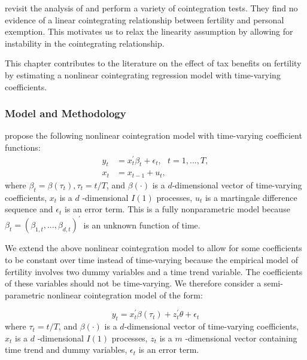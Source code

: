\documentclass[a4paper,12pt,times,numbered,print,index]{report}
\numberwithin{equation}{section}
\begin{document}
 \cite{crump2011fertility} revisit the analysis of \cite{whittington1990fertility} and perform a variety of cointegration tests. They find no evidence of a linear cointegrating relationship between fertility and personal exemption. This motivates us to relax the linearity assumption by allowing for instability in the cointegrating relationship.

This chapter contributes to the literature on the effect of tax benefits on fertility by estimating a nonlinear cointegrating regression model with time-varying coefficients.

\subsubsection*{Model and Methodology}
\cite{phillips2017estimating} propose the following nonlinear cointegration
model with time-varying coefficient functions:%
\begin{align*}
y_{t} &= x_{t}^{\prime }\beta _{t}+\epsilon _{t},\ \ \ t=1,...,T,
\\
x_{t} &= x_{t-1}+u_{t},  \nonumber
\end{align*}%
where $\beta _{t}=\beta \left( \tau _{t}\right) ,\tau _{t}=t/T$, and $\beta \left(
\cdot \right) $ is a $d$-dimensional vector of time-varying coefficients, $x_{t}$ is a $d$%
-dimensional $I\left( 1\right) $ processes, $u_{t}$ is a martingale difference sequence and $\epsilon _{t}$ is an error term. This is a fully nonparametric model because $\beta _{t}=\left( \beta _{1,t},...,\beta _{d,t}\right)
^{\prime }$ is an unknown function of time. 

We extend the above nonlinear cointegration model to allow for some coefficients to be constant over time instead of time-varying because
the empirical model of fertility involves two dummy variables and a time trend variable. The coefficients of these variables should not be time-varying. We therefore consider a semi-parametric nonlinear cointegration model of the form:%

\begin{equation}
	y_{t}=x_{t}^{\prime} \beta\left(\tau_{t}\right)+z_{t}^{\prime} \theta+\epsilon_{t}
	\label{tv model}
\end{equation}
where $\tau _{t}=t/T$, and $\beta \left(
\cdot \right) $ is a $d$-dimensional vector of time-varying coefficients, $x_{t}$ is a $d$%
-dimensional $I\left( 1\right) $ processes, $z_{t}$ is a $m$%
-dimensional vector containing time trend and dummy variables, $\epsilon _{t}$ is an error term.
\end{document}
